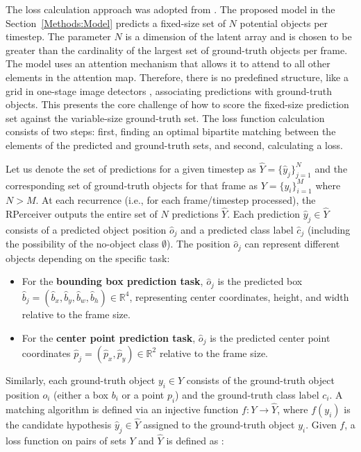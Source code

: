 The loss calculation approach was adopted from \cite{carionEndtoEndObjectDetection2020, stewartEndtoendPeopleDetection2015}. The proposed model in the Section~\ref{Methods:Model} predicts a fixed-size set of $N$ potential objects per timestep. The parameter $N$ is a dimension of the latent array and is chosen to be greater than the cardinality of the largest set of ground-truth objects per frame. The model uses an attention mechanism that allows it to attend to all other elements in the attention map. Therefore, there is no predefined structure, like a grid in one-stage image detectors \cite{redmonYouOnlyLook2016}, associating predictions with ground-truth objects. This presents the core challenge of how to score the fixed-size prediction set against the variable-size ground-truth set. The loss function calculation consists of two steps: first, finding an optimal bipartite matching between the elements of the predicted and ground-truth sets, and second, calculating a loss.

Let us denote the set of predictions for a given timestep as $ \hat{Y} = \{\hat{y}_j\}_{j=1}^N $ and the corresponding set of ground-truth objects for that frame as $ Y = \{y_i\}_{i=1}^M $ where $ N > M $. At each recurrence (i.e., for each frame/timestep processed), the RPerceiver outputs the entire set of $N$ predictions $\hat{Y}$. Each prediction $\hat{y}_j \in \hat{Y}$ consists of a predicted object position $\hat{o}_j$ and a predicted class label $\hat{c}_j$ (including the possibility of the no-object class $\emptyset$). The position $\hat{o}_j$ can represent different objects depending on the specific task:
\begin{itemize}
    \item For the \textbf{bounding box prediction task}, $\hat{o}_j$ is the predicted box $\hat{b}_j = (\hat{b}_x, \hat{b}_y, \hat{b}_w, \hat{b}_h) \in \mathbb{R}^4$, representing center coordinates, height, and width relative to the frame size.
    \item For the \textbf{center point prediction task}, $\hat{o}_j$ is the predicted center point coordinates $\hat{p}_j = (\hat{p}_x, \hat{p}_y) \in \mathbb{R}^2$ relative to the frame size.
\end{itemize}
Similarly, each ground-truth object $y_i \in Y$ consists of the ground-truth object position $o_i$ (either a box $b_i$ or a point $p_i$) and the ground-truth class label $c_i$.
A matching algorithm is defined via an injective function $f: Y \rightarrow \hat{Y}$, where $f(y_i)$ is the candidate hypothesis $\hat{y}_j \in \hat{Y}$ assigned to the ground-truth object $y_i$. Given $f$, a loss function on pairs of sets $Y$ and $\hat{Y}$ is defined as \cite{stewartEndtoendPeopleDetection2015}:

